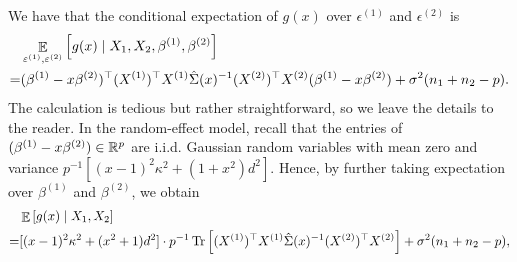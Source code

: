 We have that the conditional expectation of $g(x)$ over $\epsilon^{(1)}$ and $\epsilon^{(2)}$ is
\begin{align*}
		&\mathop{\mathbb{E}}_{\varepsilon^{(1)}, \varepsilon^{(2)}}\left[ g(x) \mid X_1, X_2 ,\beta^{(1)},\beta^{(2)} \right] \\
		=& (\beta^{(1)}-x\beta^{(2)})^\top(X^{(1)} )^\top X^{(1)}  \hat\Sigma(x)^{-1} (X^{(2)})^\top X^{(2)} (\beta^{(1)}-x\beta^{(2)}) +\sigma^2(n_1+n_2-p).
\end{align*}
The calculation is tedious but rather straightforward, so we leave the details to the reader.
In the random-effect model, recall that the entries of $(\beta^{(1)}- x\beta^{(2)})\in \mathbb{R}^p$ are i.i.d. Gaussian random variables with mean zero and variance $p^{-1}[(x-1)^2\kappa^2 +(1+x^2) d^2]$.
Hence, by further taking expectation over $\beta^{(1)}$ and $\beta^{(2)}$, we obtain
\begin{align}
	&\mathop{\mathbb{E}}\left[ g(x) \mid X_1, X_2 \right] \nonumber\\
	=& [(x-1)^2\kappa^2 + (x^2+1)d^2]\cdot {p^{-1}} \operatorname{Tr}\left[ (X^{(1)})^\top X^{(1)} \hat \Sigma(x)^{-1}(X^{(2)})^\top X^{(2)}\right]+\sigma^2(n_1+n_2-p), \label{EgA}
\end{align}



